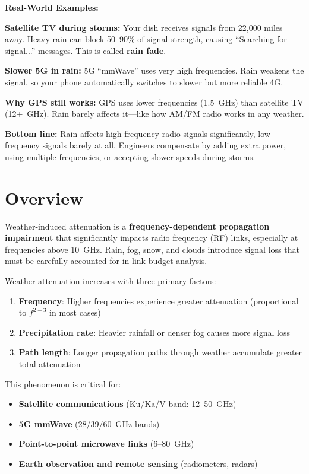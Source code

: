 \begin{nontechnical}
\vspace{6pt}
\textbf{Real-World Examples:}

\textbf{Satellite TV during storms:} Your dish receives signals from 22,000 miles away. Heavy rain can block 50--90\% of signal strength, causing ``Searching for signal...'' messages. This is called \textbf{rain fade}.

\textbf{Slower 5G in rain:} 5G ``mmWave'' uses very high frequencies. Rain weakens the signal, so your phone automatically switches to slower but more reliable 4G.

\textbf{Why GPS still works:} GPS uses lower frequencies (1.5~GHz) than satellite TV (12+~GHz). Rain barely affects it---like how AM/FM radio works in any weather.

\vspace{6pt}
\textbf{Bottom line:} Rain affects high-frequency radio signals significantly, low-frequency signals barely at all. Engineers compensate by adding extra power, using multiple frequencies, or accepting slower speeds during storms.
\end{nontechnical}

\section{Overview}

Weather-induced attenuation is a \textbf{frequency-dependent propagation impairment} that significantly impacts radio frequency (RF) links, especially at frequencies above 10~GHz. Rain, fog, snow, and clouds introduce signal loss that must be carefully accounted for in link budget analysis.

\begin{keyconcept}
Weather attenuation increases with three primary factors:
\begin{enumerate}
\item \textbf{Frequency}: Higher frequencies experience greater attenuation (proportional to $f^{2-3}$ in most cases)
\item \textbf{Precipitation rate}: Heavier rainfall or denser fog causes more signal loss
\item \textbf{Path length}: Longer propagation paths through weather accumulate greater total attenuation
\end{enumerate}
\end{keyconcept}

This phenomenon is critical for:
\begin{itemize}
\item \textbf{Satellite communications} (Ku/Ka/V-band: 12--50~GHz)
\item \textbf{5G mmWave} (28/39/60~GHz bands)
\item \textbf{Point-to-point microwave links} (6--80~GHz)
\item \textbf{Earth observation and remote sensing} (radiometers, radars)
\end{itemize}

